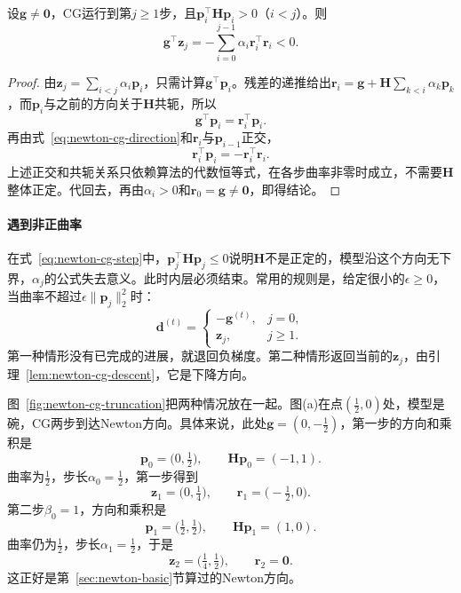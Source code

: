\begin{lemma}[CG迭代的下降性]
\label{lem:newton-cg-descent}
设$\bm{g}\neq\bm{0}$，CG运行到第$j\geq1$步，且$\bm{p}_i^\top\bm{H}\bm{p}_i>0$（$i<j$）。则
\begin{equation}
 \bm{g}^\top\bm{z}_j=-\sum_{i=0}^{j-1}\alpha_i\bm{r}_i^\top\bm{r}_i<0.
 \label{eq:newton-cg-descent}
\end{equation}
\end{lemma}

\begin{proof}
由$\bm{z}_j=\sum_{i<j}\alpha_i\bm{p}_i$，只需计算$\bm{g}^\top\bm{p}_i$。残差的递推给出$\bm{r}_i=\bm{g}+\bm{H}\sum_{k<i}\alpha_k\bm{p}_k$，而$\bm{p}_i$与之前的方向关于$\bm{H}$共轭，所以
\[
 \bm{g}^\top\bm{p}_i=\bm{r}_i^\top\bm{p}_i.
\]
再由式~\eqref{eq:newton-cg-direction}和$\bm{r}_i$与$\bm{p}_{i-1}$正交，
\[
 \bm{r}_i^\top\bm{p}_i=-\bm{r}_i^\top\bm{r}_i.
\]
上述正交和共轭关系只依赖算法的代数恒等式，在各步曲率非零时成立，不需要$\bm{H}$整体正定。代回去，再由$\alpha_i>0$和$\bm{r}_0=\bm{g}\neq\bm{0}$，即得结论。
\end{proof}

\paragraph{遇到非正曲率}
在式~\eqref{eq:newton-cg-step}中，$\bm{p}_j^\top\bm{H}\bm{p}_j\leq0$说明$\bm{H}$不是正定的，模型沿这个方向无下界，$\alpha_j$的公式失去意义。此时内层必须结束。常用的规则是，给定很小的$\epsilon\geq0$，当曲率不超过$\epsilon\lVert\bm{p}_j\rVert_2^2$时：
\begin{equation}
 \bm{d}^{(t)}=\begin{cases}-\bm{g}^{(t)},&j=0,\\\bm{z}_j,&j\geq1.\end{cases}
 \label{eq:newton-cg-truncate}
\end{equation}
第一种情形没有已完成的进展，就退回负梯度。第二种情形返回当前的$\bm{z}_j$，由引理~\ref{lem:newton-cg-descent}，它是下降方向。

图~\ref{fig:newton-cg-truncation}把两种情况放在一起。图(a)在点$(\tfrac12,0)$处，模型是碗，CG两步到达Newton方向。具体来说，此处$\bm{g}=(0,-\tfrac12)$，第一步的方向和乘积是
\[
 \bm{p}_0=\bigl(0,\tfrac12\bigr),\qquad \bm{H}\bm{p}_0=(-1,1).
\]
曲率为$\tfrac12$，步长$\alpha_0=\tfrac12$，第一步得到
\[
 \bm{z}_1=\bigl(0,\tfrac14\bigr),\qquad \bm{r}_1=\bigl(-\tfrac12,0\bigr).
\]
第二步$\beta_0=1$，方向和乘积是
\[
 \bm{p}_1=\bigl(\tfrac12,\tfrac12\bigr),\qquad \bm{H}\bm{p}_1=(1,0).
\]
曲率仍为$\tfrac12$，步长$\alpha_1=\tfrac12$，于是
\[
 \bm{z}_2=\bigl(\tfrac14,\tfrac12\bigr),\qquad \bm{r}_2=\bm{0}.
\]
这正好是第~\ref{sec:newton-basic}节算过的Newton方向。

